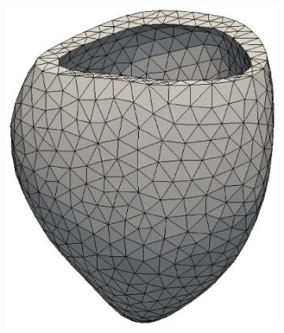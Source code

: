 \begin{figure}[htbp]
\centering
\begin{subfigure}[t]{0.25\textwidth}
     \centering
     \caption{\label{paper1:fig:ultrasound_image}}
\end{subfigure}
\qquad
\begin{subfigure}[t]{0.25\textwidth}
    \includegraphics[width=\textwidth, trim={15cm 4cm 21cm 3cm}, clip]{mesh}

\end{subfigure}
\end{figure}
